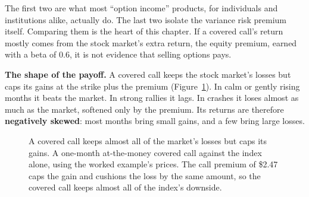 The first two are what most ``option income'' products, for individuals and institutions alike, actually do. The last two isolate the variance risk premium itself. Comparing them is the heart of this chapter. If a covered call's return mostly comes from the stock market's extra return, the equity premium, earned with a beta of 0.6, it is not evidence that selling options pays.

\textbf{The shape of the payoff.} A covered call keeps the stock market's losses but caps its gains at the strike plus the premium (Figure~\ref{fig:16-cc}). In calm or gently rising months it beats the market. In strong rallies it lags. In crashes it loses almost as much as the market, softened only by the premium. Its returns are therefore \textbf{negatively skewed}: most months bring small gains, and a few bring large losses.

\begin{figure}[htbp]
\centering
{}
\caption{A covered call keeps almost all of the market's losses but caps its gains. A one-month at-the-money covered call against the index alone, using the worked example's prices. The call premium of \$2.47 caps the gain and cushions the loss by the same amount, so the covered call keeps almost all of the index's downside.}
\label{fig:16-cc}
\end{figure}

